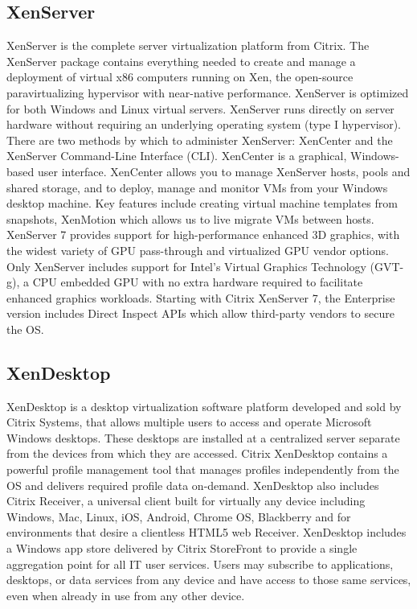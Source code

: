 \subsection{XenServer}
XenServer is the complete server virtualization platform from Citrix. The XenServer package contains everything needed to create and manage a deployment of virtual x86 computers running on Xen, the open-source paravirtualizing hypervisor with near-native performance. XenServer is optimized for both Windows and Linux virtual servers. XenServer runs directly on server hardware without requiring an underlying operating system (type I hypervisor). There are two methods by which to administer XenServer: XenCenter and the XenServer Command-Line Interface (CLI). XenCenter is a graphical, Windows-based user interface. XenCenter allows you to manage XenServer hosts, pools and shared storage, and to deploy, manage and monitor VMs from your Windows desktop machine. Key features include creating virtual machine templates from snapshots, XenMotion which allows us to live migrate VMs between hosts. XenServer 7 provides support for high-performance enhanced 3D graphics, with the widest variety of GPU pass-through and virtualized GPU vendor options. Only XenServer includes support for Intel’s Virtual Graphics Technology (GVT-g), a CPU embedded GPU with no extra hardware required to facilitate enhanced graphics workloads. Starting with Citrix XenServer 7, the Enterprise version includes Direct Inspect APIs which allow third-party vendors to secure the OS.

\subsection{XenDesktop}
XenDesktop is a desktop virtualization software platform developed and sold by Citrix Systems, that allows multiple users to access and operate Microsoft Windows desktops. These desktops are installed at a centralized server separate from the devices from which they are accessed. Citrix XenDesktop contains a powerful profile management tool that manages profiles independently from the OS and delivers required profile data on-demand. XenDesktop also includes Citrix Receiver, a universal client built for virtually any device including Windows, Mac, Linux, iOS, Android, Chrome OS, Blackberry and for environments that desire a clientless HTML5 web Receiver. XenDesktop includes a Windows app store delivered by Citrix StoreFront to provide a single aggregation point for all IT user services. Users may subscribe to applications, desktops, or data services from any device and have access to those same services, even when already in use from any other device.

